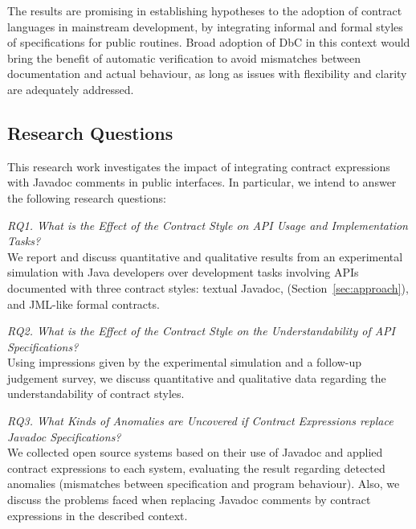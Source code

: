 The results are promising in establishing hypotheses to the adoption of contract languages in mainstream development, by integrating informal and formal styles of specifications for public routines.
Broad adoption of DbC in this context would bring the benefit of automatic verification to avoid mismatches between documentation and actual behaviour, as long as issues with flexibility and clarity are adequately addressed. 


\subsection{Research Questions}
\label{sec:researchQuestions}

This research work investigates the impact of integrating contract expressions with Javadoc comments in public interfaces. 
In particular, we intend to answer the following research questions:  

\noindent\emph{RQ1. What is the Effect of the Contract Style on API Usage and Implementation Tasks?}\\
We report and discuss quantitative and qualitative results from an experimental simulation with Java developers over development tasks involving APIs documented with three contract styles: textual Javadoc, \contractjdoc{} (Section~\ref{sec:approach}), and JML-like formal contracts. 

\noindent\emph{RQ2. What is the Effect of the Contract Style on the Understandability of API Specifications?}\\
Using impressions given by the experimental simulation and a follow-up judgement survey, we discuss quantitative and qualitative data regarding the understandability of contract styles.

\noindent\emph{RQ3. What Kinds of Anomalies are Uncovered if Contract Expressions replace Javadoc Specifications?}\\
We collected open source systems based on their use of Javadoc and applied contract expressions
to each system, evaluating the result regarding detected anomalies (mismatches between specification and program behaviour). Also, we discuss the problems faced when replacing Javadoc comments by contract expressions in the described context.
